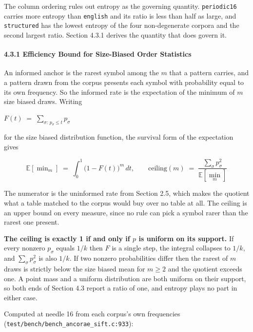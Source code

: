The column ordering rules out entropy as the governing quantity. \texttt{periodic16} carries more entropy than \texttt{english} and its ratio is less than half as large, and \texttt{structured} has the lowest entropy of the four non-degenerate corpora and the second largest ratio. Section 4.3.1 derives the quantity that does govern it.

\paragraph{4.3.1 Efficiency Bound for Size-Biased Order Statistics}

An informed anchor is the rarest symbol among the \(m\) that a pattern carries, and a pattern drawn from the corpus presents each symbol with probability equal to its own frequency. So the informed rate is the expectation of the minimum of \(m\) size biased draws. Writing

\(F(t) \;=\; \sum_{\sigma:\, p_\sigma \le t} p_\sigma\)

for the size biased distribution function, the survival form of the expectation gives

\[
\mathbb{E}[\min\nolimits_m] \;=\; \int_0^1 \bigl(1 - F(t)\bigr)^m \, dt, \qquad
\text{ceiling}(m) \;=\; \frac{\sum_\sigma p_\sigma^2}{\mathbb{E}[\min_m]}
\]

The numerator is the uninformed rate from Section 2.5, which makes the quotient what a table matched to the corpus would buy over no table at all. The ceiling is an upper bound on every measure, since no rule can pick a symbol rarer than the rarest one present.

\textbf{The ceiling is exactly 1 if and only if \(p\) is uniform on its support.} If every nonzero \(p_\sigma\) equals \(1/k\) then \(F\) is a single step, the integral collapses to \(1/k\), and \(\sum_\sigma p_\sigma^2\) is also \(1/k\). If two nonzero probabilities differ then the rarest of \(m\) draws is strictly below the size biased mean for \(m \ge 2\) and the quotient exceeds one. A point mass and a uniform distribution are both uniform on their support, so both ends of Section 4.3 report a ratio of one, and entropy plays no part in either case.

Computed at needle 16 from each corpus's own frequencies (\texttt{test/\allowbreak{}bench/\allowbreak{}bench\_\allowbreak{}ancorae\_\allowbreak{}sift.\allowbreak{}c:933}):


